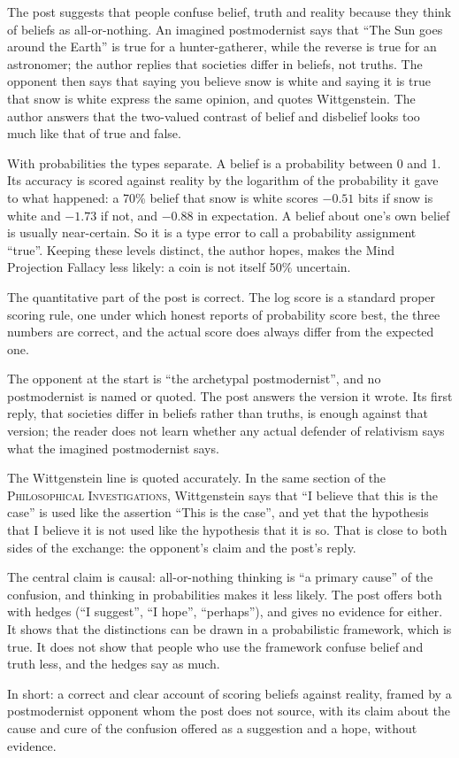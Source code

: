 \begin{afterword}
\summaryhead

The post suggests that people confuse belief, truth and reality because they think of beliefs as all-or-nothing. An imagined postmodernist says that ``The Sun goes around the Earth'' is true for a hunter-gatherer, while the reverse is true for an astronomer; the author replies that societies differ in beliefs, not truths. The opponent then says that saying you believe snow is white and saying it is true that snow is white express the same opinion, and quotes Wittgenstein. The author answers that the two-valued contrast of belief and disbelief looks too much like that of true and false.

With probabilities the types separate. A belief is a probability between 0 and 1. Its accuracy is scored against reality by the logarithm of the probability it gave to what happened: a 70\% belief that snow is white scores $-0.51$ bits if snow is white and $-1.73$ if not, and $-0.88$ in expectation. A belief about one's own belief is usually near-certain. So it is a type error to call a probability assignment ``true''. Keeping these levels distinct, the author hopes, makes the Mind Projection Fallacy less likely: a coin is not itself 50\% uncertain.

\responsehead

The quantitative part of the post is correct. The log score is a standard proper scoring rule, one under which honest reports of probability score best, the three numbers are correct, and the actual score does always differ from the expected one.

The opponent at the start is ``the archetypal postmodernist'', and no postmodernist is named or quoted. The post answers the version it wrote. Its first reply, that societies differ in beliefs rather than truths, is enough against that version; the reader does not learn whether any actual defender of relativism says what the imagined postmodernist says.

The Wittgenstein line is quoted accurately. In the same section of the \textsc{Philosophical Investigations}, Wittgenstein says that ``I believe that this is the case'' is used like the assertion ``This is the case'', and yet that the hypothesis that I believe it is not used like the hypothesis that it is so. That is close to both sides of the exchange: the opponent's claim and the post's reply.

The central claim is causal: all-or-nothing thinking is ``a primary cause'' of the confusion, and thinking in probabilities makes it less likely. The post offers both with hedges (``I suggest'', ``I hope'', ``perhaps''), and gives no evidence for either. It shows that the distinctions can be drawn in a probabilistic framework, which is true. It does not show that people who use the framework confuse belief and truth less, and the hedges say as much.

In short: a correct and clear account of scoring beliefs against reality, framed by a postmodernist opponent whom the post does not source, with its claim about the cause and cure of the confusion offered as a suggestion and a hope, without evidence.
\end{afterword}
